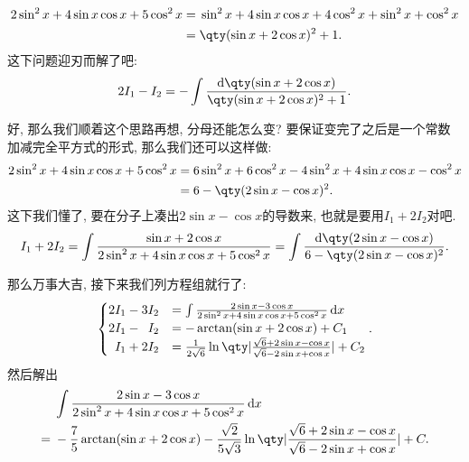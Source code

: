 \documentclass{ctexbook}
\newcommand*{\dif}{\mathop{}\!\mathrm{d}}
\begin{document}
{\begin{align*}
2\sin^{2}{x}+4\sin{x}\cos{x}+5\cos^{2}{x}={}&\sin^{2}{x}+4\sin{x}\cos{x}+4\cos^{2}{x}+\sin^{2}{x}+\cos^{2}{x}\\
={}&\qty(\sin{x}+2\cos{x})^{2}+1
.\end{align*}
这下问题迎刃而解了吧: 
\begin{align*}
2I_{1}-I_{2}=-\int\frac{\dif{\qty(\sin{x}+2\cos{x})}}{\qty(\sin{x}+2\cos{x})^{2}+1}
.\end{align*}\par
好, 那么我们顺着这个思路再想, 分母还能怎么变? 要保证变完了之后是一个常数加减完全平方式的形式, 那么我们还可以这样做: 
\begin{align*}
2\sin^{2}{x}+4\sin{x}\cos{x}+5\cos^{2}{x}={}&6\sin^{2}{x}+6\cos^{2}{x}-4\sin^{2}{x}+4\sin{x}\cos{x}-\cos^{2}{x}\\
={}&6-\qty(2\sin{x}-\cos{x})^{2}
.\end{align*}
这下我们懂了, 要在分子上凑出$2\sin{x}-\cos{x}$的导数来, 也就是要用$I_{1}+2I_{2}$对吧. 
\begin{align*}
I_{1}+2I_{2}=\int\frac{\sin{x}+2\cos{x}}{2\sin^{2}{x}+4\sin{x}\cos{x}+5\cos^{2}{x}}=\int\frac{\dif{\qty(2\sin{x}-\cos{x})}}{6-\qty(2\sin{x}-\cos{x})^{2}}
.\end{align*}\par
那么万事大吉, 接下来我们列方程组就行了: 
\begin{align*}
\begin{cases}
2I_{1}-3I_{2}&=\int\frac{2\sin{x}-3\cos{x}}{2\sin^{2}{x}+4\sin{x}\cos{x}+5\cos^{2}{x}}\dif{x}\\
2I_{1}-\;\:I_{2}&=-\arctan(\sin{x}+2\cos{x})+C_{1}\\
\;\:I_{1}+2I_{2}&=\frac{1}{2\sqrt{6}}\ln\qty|\frac{\sqrt{6}+2\sin{x}-\cos{x}}{\sqrt{6}-2\sin{x}+\cos{x}}|+C_{2}
\end{cases}
.\end{align*}
然后解出
\begin{align*}
{}&\int\frac{2\sin{x}-3\cos{x}}{2\sin^{2}{x}+4\sin{x}\cos{x}+5\cos^{2}{x}}\dif{x}\\
={}&-\frac{7}{5}\arctan(\sin{x}+2\cos{x})-\frac{\sqrt{2}}{5\sqrt{3}}\ln\qty|\frac{\sqrt{6}+2\sin{x}-\cos{x}}{\sqrt{6}-2\sin{x}+\cos{x}}|+C
.\end{align*}\par
}
\end{document}
